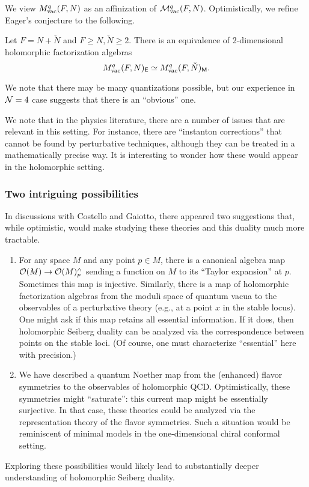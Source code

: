 \documentclass[11pt]{amsart}
\begin{document}
We view $M^q_{\rm vac}(F,N)$ as an affinization of $\mathcal M^q_{\rm vac}(F,N)$.
Optimistically, we refine Eager's conjecture to the following. 

\begin{conj}
Let $F = N + \check{N}$ and $F \geq N, \check{N} \geq 2$.
There is an equivalence of 2-dimensional holomorphic factorization algebras
\[
M^q_{\rm vac}(F,N)_{\mathsf E} \simeq M^q_{\rm vac}(F,\check{N})_{{\sf M}}.
\]
\end{conj}

We note that there may be many quantizations possible, but our experience in $\mathcal N=4$ case suggests that there is an ``obvious'' one.

\begin{rmk}
We note that in the physics literature, there are a number of issues that are relevant in this setting.
For instance, there are ``instanton corrections'' that cannot be found by perturbative techniques, although they can be treated in a mathematically precise way. 
It is interesting to wonder how these would appear in the holomorphic setting.
\end{rmk}

\subsubsection{Two intriguing possibilities}

In discussions with Costello and Gaiotto, there appeared two suggestions that, while optimistic, would make studying these theories and this duality much more tractable.
\begin{enumerate}

\item For any space $M$ and any point $p \in M$, there is a canonical algebra map $\mathcal O(M) \to \mathcal O(M)^\wedge_p$ sending a function on $M$ to its ``Taylor expansion'' at $p$. 
Sometimes this map is injective. 
Similarly, there is a map of holomorphic factorization algebras from the moduli space of quantum vacua to the observables of a perturbative theory (e.g., at a point $x$ in the stable locus).
One might ask if this map retains all essential information. 
If it does, then holomorphic Seiberg duality can be analyzed via the correspondence between points on the stable loci.
(Of course, one must characterize ``essential'' here with precision.)

\item We have described a quantum Noether map from the (enhanced) flavor symmetries to the observables of holomorphic QCD. 
Optimistically, these symmetries might ``saturate'': this current map might be essentially surjective.
In that case, these theories could be analyzed via the representation theory of the flavor symmetries.
Such a situation would be reminiscent of minimal models in the one-dimensional chiral conformal setting.

\end{enumerate}
Exploring these possibilities would likely lead to substantially deeper understanding of holomorphic Seiberg duality.
\end{document}
